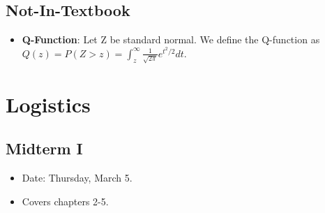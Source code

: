 \documentclass[a4paper,12pt]{report}
\begin{document}
\section{Not-In-Textbook}
\begin{itemize}
\item \textbf{Q-Function}: Let Z be standard normal. We define the Q-function as $Q(z) = P(Z>z) = \int_z^{\infty} \frac{1}{\sqrt{2\pi}} e^{t^2/2}dt$. 
\end{itemize}

\chapter{Logistics}

\section{Midterm I}
\begin{itemize}
\item Date: Thursday, March 5. 
\item Covers chapters 2-5.
\end{itemize}
\end{document}
